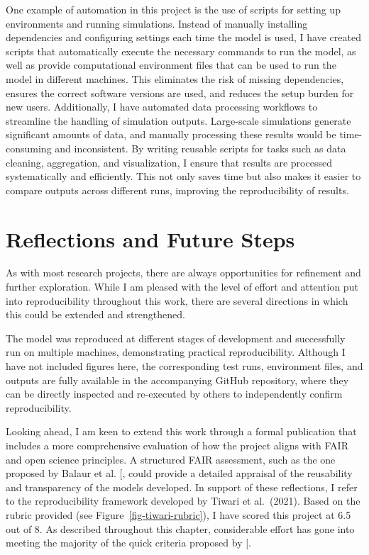 \documentclass[
  11pt,
  letterpaper,
]{scrreprt}
\begin{document}
One example of automation in this project is the use of scripts for
setting up environments and running simulations. Instead of manually
installing dependencies and configuring settings each time the model is
used, I have created scripts that automatically execute the necessary
commands to run the model, as well as provide computational environment
files that can be used to run the model in different machines. This
eliminates the risk of missing dependencies, ensures the correct
software versions are used, and reduces the setup burden for new users.
Additionally, I have automated data processing workflows to streamline
the handling of simulation outputs. Large-scale simulations generate
significant amounts of data, and manually processing these results would
be time-consuming and inconsistent. By writing reusable scripts for
tasks such as data cleaning, aggregation, and visualization, I ensure
that results are processed systematically and efficiently. This not only
saves time but also makes it easier to compare outputs across different
runs, improving the reproducibility of results.

\section{Reflections and Future
Steps}\label{reflections-and-future-steps}

As with most research projects, there are always opportunities for
refinement and further exploration. While I am pleased with the level of
effort and attention put into reproducibility throughout this work,
there are several directions in which this could be extended and
strengthened.

The model was reproduced at different stages of development and
successfully run on multiple machines, demonstrating practical
reproducibility. Although I have not included figures here, the
corresponding test runs, environment files, and outputs are fully
available in the accompanying GitHub repository, where they can be
directly inspected and re-executed by others to independently confirm
reproducibility.

Looking ahead, I am keen to extend this work through a formal
publication that includes a more comprehensive evaluation of how the
project aligns with FAIR and open science principles. A structured FAIR
assessment, such as the one proposed by Balaur et al.
{[}\citeproc{ref-balaur2025FAIRification}{398}{]}, could provide a
detailed appraisal of the reusability and transparency of the models
developed. In support of these reflections, I refer to the
reproducibility framework developed by Tiwari et al.~(2021). Based on
the rubric provided (see Figure~\ref{fig-tiwari-rubric}), I have scored
this project at 6.5 out of 8. As described throughout this chapter,
considerable effort has gone into meeting the majority of the quick
criteria proposed by
{[}\citeproc{ref-tiwari2021Reproducibility}{399}{]}.
\end{document}
